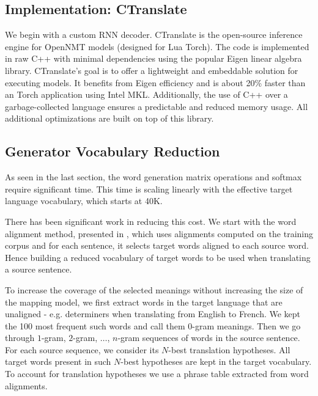 \documentclass[11pt,a4paper]{article}
\begin{document}
\subsection{Implementation: CTranslate}

We begin with a custom RNN decoder.  CTranslate is the open-source
inference engine for OpenNMT models (designed for Lua Torch).  The
code is implemented in raw C++ with minimal dependencies using the
popular Eigen linear algebra library. CTranslate's goal is to offer a
lightweight and embeddable solution for executing models. It benefits
from Eigen efficiency and is about 20\% faster than an Torch
application using Intel MKL. Additionally, the use of C++ over a
garbage-collected language ensures a predictable and reduced memory
usage. All additional optimizations are built on top of this library.


\subsection{Generator Vocabulary Reduction}

As seen in the last section, the word generation matrix operations and softmax require significant time. This time is scaling linearly with the effective target language vocabulary, which starts at 40K.

There has been significant work in reducing this cost. We start with the word alignment method, presented in , which uses alignments computed on the training corpus and for each sentence, it selects target words aligned to each source word. Hence building a reduced vocabulary of target words to be used when translating a source sentence.


To increase the coverage of the selected meanings without increasing the size of the mapping model, we first extract words in the target language that are unaligned - e.g. determiners when translating from English to French. We kept the 100 most frequent such words and call them $0$-gram meanings. Then we go through $1$-gram, $2$-gram, $\ldots$, $n$-gram sequences of words in the source sentence. For each source sequence, we consider its $N$-best translation hypotheses. All target words present in such $N$-best hypotheses are kept in the target vocabulary. To account for translation hypotheses we use a phrase table extracted from word alignments.
\end{document}
